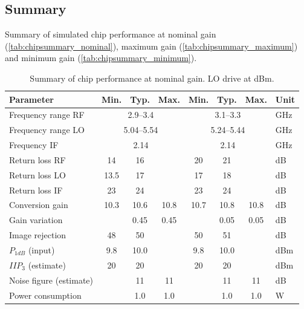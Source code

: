 		\subsection{Summary}
			Summary of simulated chip performance at nominal gain (\autoref{tab:chipsummary_nominal}), maximum gain (\autoref{tab:chipsummary_maximum}) and minimum gain (\autoref{tab:chipsummary_minimum}).
			
			\begin{table}[hbt!]
				\caption[Summarized chip performance at nominal gain.]{Summary of chip performance at nominal gain. LO drive at \unit[-2]{dBm}.\disclaimer}
				\label{tab:chipsummary_nominal}
				\centering
				\begin{tabular}{ l c c c c c c l } \toprule
					Parameter & Min. & Typ. & Max. & Min. & Typ. & Max. & Unit \\\midrule
					Frequency range RF & \multicolumn{3}{c}{2.9--3.4} & \multicolumn{3}{c}{3.1--3.3} & GHz \\
					Frequency range LO & \multicolumn{3}{c}{5.04--5.54} & \multicolumn{3}{c}{5.24--5.44} & GHz \\
					Frequency IF & \multicolumn{3}{c}{2.14} & \multicolumn{3}{c}{2.14} & GHz \\
					Return loss RF & 14 & 16 &  & 20 & 21 &  & dB \\
					Return loss LO & 13.5 & 17 &  & 17 & 18 &  & dB \\
					Return loss IF & 23 & 24 &  & 23 & 24 &  & dB \\
					Conversion gain & 10.3 & 10.6 & 10.8 & 10.7 & 10.8 & 10.8 & dB \\
					Gain variation & & 0.45 & 0.45 & & 0.05 & 0.05 & dB \\
					Image rejection & 48 & 50 &  & 50 & 51 &  &  dB \\
					$P_{1dB}$ (input) & 9.8 & 10.0 &  & 9.8 & 10.0 &  & dBm \\
					$IIP_3$ (estimate) & 20 & 20 &  & 20 & 20 &  & dBm \\
					Noise figure (estimate) &  & 11 & 11 &  & 11 & 11 & dB \\
					Power consumption &  & 1.0 & 1.0 &  & 1.0 & 1.0 & W \\\bottomrule
				\end{tabular}
			\end{table}
			
